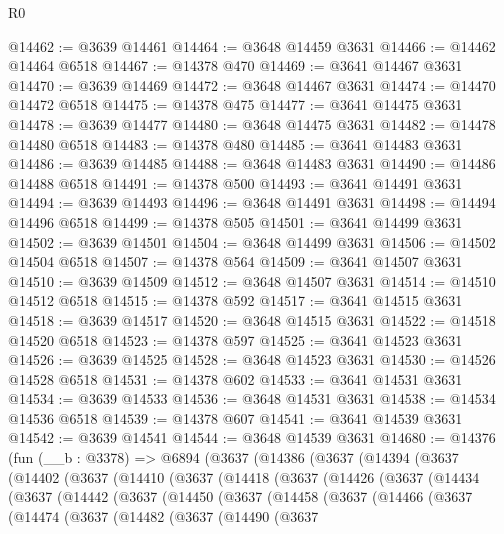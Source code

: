 \begin{lexlean}{R0}
\begin{coremodule}
@14462 := @3639 @14461
@14464 := @3648 @14459 @3631
@14466 := @14462 @14464 @6518
@14467 := @14378 @470
@14469 := @3641 @14467 @3631
@14470 := @3639 @14469
@14472 := @3648 @14467 @3631
@14474 := @14470 @14472 @6518
@14475 := @14378 @475
@14477 := @3641 @14475 @3631
@14478 := @3639 @14477
@14480 := @3648 @14475 @3631
@14482 := @14478 @14480 @6518
@14483 := @14378 @480
@14485 := @3641 @14483 @3631
@14486 := @3639 @14485
@14488 := @3648 @14483 @3631
@14490 := @14486 @14488 @6518
@14491 := @14378 @500
@14493 := @3641 @14491 @3631
@14494 := @3639 @14493
@14496 := @3648 @14491 @3631
@14498 := @14494 @14496 @6518
@14499 := @14378 @505
@14501 := @3641 @14499 @3631
@14502 := @3639 @14501
@14504 := @3648 @14499 @3631
@14506 := @14502 @14504 @6518
@14507 := @14378 @564
@14509 := @3641 @14507 @3631
@14510 := @3639 @14509
@14512 := @3648 @14507 @3631
@14514 := @14510 @14512 @6518
@14515 := @14378 @592
@14517 := @3641 @14515 @3631
@14518 := @3639 @14517
@14520 := @3648 @14515 @3631
@14522 := @14518 @14520 @6518
@14523 := @14378 @597
@14525 := @3641 @14523 @3631
@14526 := @3639 @14525
@14528 := @3648 @14523 @3631
@14530 := @14526 @14528 @6518
@14531 := @14378 @602
@14533 := @3641 @14531 @3631
@14534 := @3639 @14533
@14536 := @3648 @14531 @3631
@14538 := @14534 @14536 @6518
@14539 := @14378 @607
@14541 := @3641 @14539 @3631
@14542 := @3639 @14541
@14544 := @3648 @14539 @3631
@14680 := @14376
    (fun (__b : @3378) =>
    @6894
      (@3637
        (@14386
          (@3637
            (@14394
              (@3637
                (@14402
                  (@3637
                    (@14410
                      (@3637
                        (@14418
                          (@3637
                            (@14426
                              (@3637
                                (@14434
                                  (@3637
                                    (@14442
                                      (@3637
                                        (@14450
                                          (@3637
                                            (@14458
                                              (@3637
                                                (@14466
                                                  (@3637
                                                    (@14474
                                                      (@3637
                                                        (@14482
                                                          (@3637
                                                            (@14490
                                                              (@3637

\end{coremodule}
\end{lexlean}
